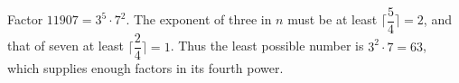 Factor $11907=3^5\cdot7^2$. The exponent of three in $n$ must be at least $\lceil\dfrac{5}{4}\rceil=2$, and that of seven at least $\lceil\dfrac{2}{4}\rceil=1$. Thus the least possible number is $3^2\cdot7=\boxed{63}$, which supplies enough factors in its fourth power.
